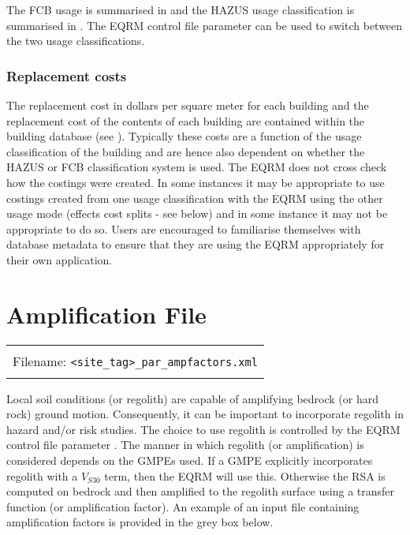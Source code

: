 The FCB usage is summarised in
 and the HAZUS usage
classification is summarised in
. The EQRM control file parameter
 can be used to switch between
the two usage classifications.


\subsubsection{Replacement costs}
\label{sec:grids-replacecosts}


The replacement cost in dollars per square meter for each building
and the replacement cost of the contents of each building are
contained within the building database
(see ).
Typically these costs are a function of the usage classification
of the building and are hence also dependent on whether the
HAZUS or FCB classification system is used. The EQRM does not cross
check how the costings were created. In some instances
it may be appropriate to use costings created from one usage
classification with the EQRM using the other usage mode (effects
cost splits - see below) and in some instance it may not be
appropriate to do so. Users are encouraged to familiarise
themselves with database metadata to ensure that they are using
the EQRM appropriately for their own application.


\clearpage

\section{Amplification File}
\label{sec:-appl-amplification}

\begin{center}
\begin{tabular}{|c|}
\hline
\\
Filename: \texttt{<site\_tag>\_par\_ampfactors.xml} \\
\\
\hline
\end{tabular} 
\end{center}

Local soil conditions (or regolith) are capable of amplifying
bedrock (or hard rock) ground motion. Consequently, it can be important
to incorporate regolith in hazard and/or risk studies.
The choice to use regolith is controlled by the EQRM control
file parameter . The manner in
which regolith (or amplification) is considered depends on
the GMPEs used. If a GMPE explicitly incorporates
regolith with a $V_{S30}$ term, then the EQRM will use this.
Otherwise the RSA is computed on bedrock and then amplified
to the regolith surface using a transfer function (or amplification factor).
An example of an input file containing amplification factors is provided in the grey box below.


